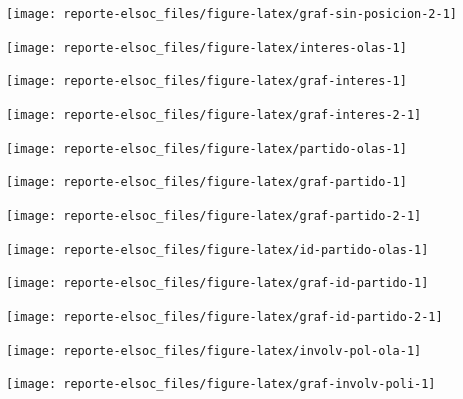 \documentclass[
  12pt,
]{book}
\begin{document}
\begin{center}\texttt{[image: reporte-elsoc\_files/figure-latex/graf-sin-posicion-2-1]} \end{center}

\begin{center}\texttt{[image: reporte-elsoc\_files/figure-latex/interes-olas-1]} \end{center}

\begin{center}\texttt{[image: reporte-elsoc\_files/figure-latex/graf-interes-1]} \end{center}

\begin{center}\texttt{[image: reporte-elsoc\_files/figure-latex/graf-interes-2-1]} \end{center}

\begin{center}\texttt{[image: reporte-elsoc\_files/figure-latex/partido-olas-1]} \end{center}

\begin{center}\texttt{[image: reporte-elsoc\_files/figure-latex/graf-partido-1]} \end{center}

\begin{center}\texttt{[image: reporte-elsoc\_files/figure-latex/graf-partido-2-1]} \end{center}

\begin{center}\texttt{[image: reporte-elsoc\_files/figure-latex/id-partido-olas-1]} \end{center}

\begin{center}\texttt{[image: reporte-elsoc\_files/figure-latex/graf-id-partido-1]} \end{center}

\begin{center}\texttt{[image: reporte-elsoc\_files/figure-latex/graf-id-partido-2-1]} \end{center}

\begin{center}\texttt{[image: reporte-elsoc\_files/figure-latex/involv-pol-ola-1]} \end{center}

\begin{center}\texttt{[image: reporte-elsoc\_files/figure-latex/graf-involv-poli-1]} \end{center}
\end{document}

